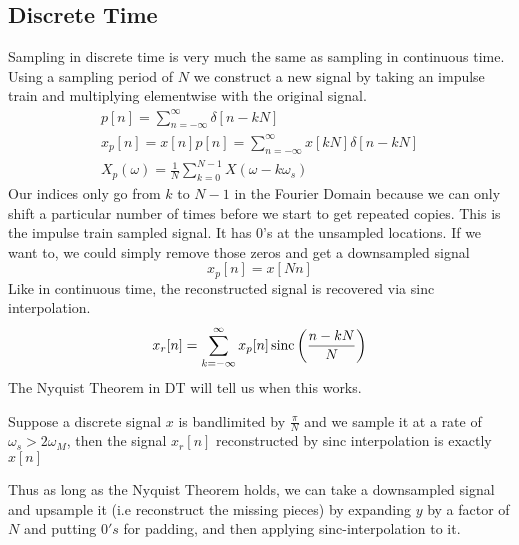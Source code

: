 \subsection{Discrete Time}
Sampling in discrete time is very much the same as sampling in continuous time. Using a sampling period of $N$
we construct a new signal by taking an impulse train and multiplying elementwise with the original signal.
\begin{align*}
    p[n]=\sum_{n=-\infty}^{\infty}{\delta[n-kN]}\\
    x_p[n] = x[n]p[n] = \sum_{n=-\infty}^{\infty}{x[kN]\delta[n-kN]}\\
    X_p(\omega) = \frac{1}{N}\sum_{k=0}^{N-1}{X(\omega-k\omega_s)}
\end{align*}
Our indices only go from $k$ to $N-1$ in the Fourier Domain because we can only shift a particular number of times
before we start to get repeated copies.
This is the impulse train sampled signal. It has 0's at the unsampled locations. If we want to, we could simply remove those zeros
and get a downsampled signal
\[
x_p[n] = x[Nn]
\]
Like in continuous time, the reconstructed signal is recovered via sinc interpolation.
\[
x_r[n] = \sum_{k=-\infty}^{\infty}{x_p[n]\operatorname*{sinc}\left(\frac{n-kN}{N}\right)}
\]
The Nyquist Theorem in DT will tell us when this works.
\begin{theorem}
    Suppose a discrete signal $x$ is bandlimited by $\frac{\pi}{N}$ and we sample it at a rate of $\omega_s > 2\omega_M$, then the signal $x_r[n]$
    reconstructed by sinc interpolation is exactly $x[n]$
\end{theorem}
Thus as long as the Nyquist Theorem holds, we can take a downsampled signal and upsample it (i.e reconstruct the missing pieces) by expanding $y$ by a factor
of $N$ and putting $0's$ for padding, and then applying sinc-interpolation to it.
